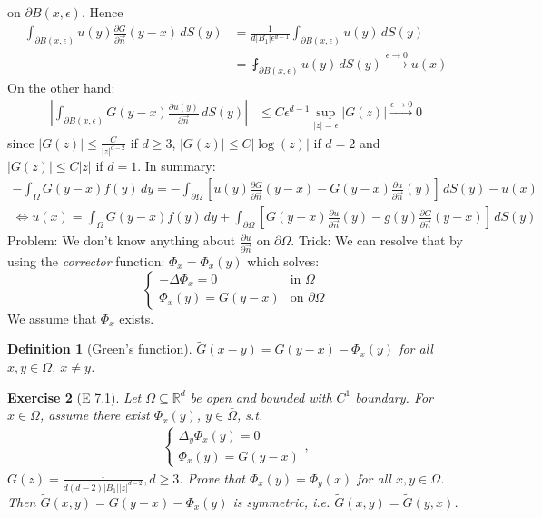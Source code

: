 \documentclass{report}
\theoremstyle{tommy}
\newtheorem{defn}{Definition}
\newtheorem{ex}[defn]{Exercise}
\begin{document}
  on \(\partial B(x, \epsilon)\). Hence
  \begin{align*}
    \int_{\partial B(x, \epsilon)} u(y) \frac{\partial G}{\partial \vec{n}}(y-x) \, dS(y) 
    &= \frac{1}{d|B_1| \epsilon^{d-1}} \int_{\partial B(x, \epsilon)} u(y) \, dS(y) \\
    &= \fint_{\partial B(x,\epsilon)} u(y) \, dS(y)
    \xrightarrow{\epsilon \to 0} u(x) 
  \end{align*}
  On the other hand:
  \begin{align*}
    \left|\int_{\partial B(x, \epsilon)} G(y-x) \frac{\partial u(y)}{\partial \vec{n}} \, dS(y)\right|
    &\le C \epsilon^{d-1} \sup_{|z| = \epsilon} |G(z)| \xrightarrow{\epsilon \to 0} 0
  \end{align*}
  since \(|G(z)|\le \frac{C}{|z|^{d-2}}\) if \(d \ge 3\), \(|G(z)|\le C |\log(z)| \) if \(d = 2\) and \(|G(z)|\le C|z|\) if \(d = 1\). In summary: 
  \begin{align*}
    - \int_\Omega G(y-x) f(y) \, dy 
    = - \int_{\partial \Omega} \left[u(y) \frac{\partial G}{\partial \vec{n}} (y-x) - G(y-x) \frac{\partial u}{\partial \vec{n}}(y)\right] \, dS(y) - u(x) \\
    \Leftrightarrow u(x) = \int_\Omega G(y-x) f(y) \, dy + \int_{\partial \Omega} \left[G(y-x) \frac{\partial u}{\partial \vec{n}}(y) - g(y) \frac{\partial G}{\partial \vec{n}}(y-x)\right] \, dS(y)
  \end{align*}
  Problem: We don't know anything about \(\frac{\partial u}{\partial \vec{n}}\) on \(\partial \Omega\). Trick: We can resolve that by using the \emph{corrector} function: \(\Phi_x = \Phi_x(y)\) which solves:
  \[\begin{cases}
    - \Delta \Phi_x = 0 & \text{in } \Omega \\ \Phi_x(y) = G(y-x) &\text{on } \partial \Omega
  \end{cases}\]
  We assume that \(\Phi_x\) exists. 

  \begin{defn}[Green's function]
    \(\tilde G(x-y) = G(y-x) - \Phi_x(y)\) for all \(x,y \in \Omega\), \(x \ne y\).
  \end{defn}
  

  \begin{ex}[E 7.1]
    Let \(\Omega \subseteq \mathbb{R}^d\) be open and bounded with \(C^1\) boundary. For \(x \in \Omega\), assume there exist \(\Phi_x(y)\), \(y \in \bar \Omega\), s.t. 
    \begin{align*}
      \begin{cases}
        \Delta_y \Phi_x(y) = 0 \\ \Phi_x(y) = G(y-x)
      \end{cases},
    \end{align*}
    \(G(z) = \frac{1}{d(d-2)|B_1||z|^{d-2}}, d \ge 3\). Prove that \(\Phi_x(y) = \Phi_y(x)\) for all \(x,y \in \Omega\). Then \(\tilde G(x,y) = G(y-x) - \Phi_x(y)\) is symmetric, i.e. \(\tilde G(x,y) = \tilde G(y,x)\).
  \end{ex}
\end{document}
